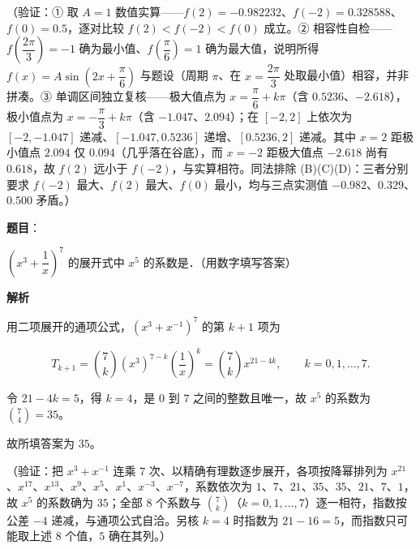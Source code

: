 \begin{answer}
（验证：① 取 \(A=1\) 数值实算——\(f(2)=-0.982232\)、\(f(-2)=0.328588\)、\(f(0)=0.5\)，逐对比较 \(f(2)<f(-2)<f(0)\) 成立。② 相容性自检——\(f\left(\dfrac{2\pi}{3}\right)=-1\) 确为最小值、\(f\left(\dfrac{\pi}{6}\right)=1\) 确为最大值，说明所得 \(f(x)=A\sin\left(2x+\dfrac{\pi}{6}\right)\) 与题设（周期 \(\pi\)、在 \(x=\dfrac{2\pi}{3}\) 处取最小值）相容，并非拼凑。③ 单调区间独立复核——极大值点为 \(x=\dfrac{\pi}{6}+k\pi\)（含 \(0.5236\)、\(-2.618\)），极小值点为 \(x=-\dfrac{\pi}{3}+k\pi\)（含 \(-1.047\)、\(2.094\)）；在 \([-2,2]\) 上依次为 \([-2,-1.047]\) 递减、\([-1.047,0.5236]\) 递增、\([0.5236,2]\) 递减。其中 \(x=2\) 距极小值点 \(2.094\) 仅 \(0.094\)（几乎落在谷底），而 \(x=-2\) 距极大值点 \(-2.618\) 尚有 \(0.618\)，故 \(f(2)\) 远小于 \(f(-2)\)，与实算相符。同法排除 (B)(C)(D)：三者分别要求 \(f(-2)\) 最大、\(f(2)\) 最大、\(f(0)\) 最小，均与三点实测值 \(-0.982\)、\(0.329\)、\(0.500\) 矛盾。）


\end{answer}
\begin{answer}

\textbf{题目}：

\(\left(x^3+\dfrac{1}{x}\right)^7\) 的展开式中 \(x^5\) 的系数是\gkblank{}．（用数字填写答案）

\textbf{解析}

用二项展开的通项公式，\((x^{3}+x^{-1})^{7}\) 的第 \(k+1\) 项为

\nopagebreak[4]
\[ T_{k+1}=\binom{7}{k}\left(x^{3}\right)^{7-k}\left(\dfrac{1}{x}\right)^{k}=\binom{7}{k}x^{21-4k},\qquad k=0,1,\dots,7 . \]

令 \(21-4k=5\)，得 \(k=4\)，是 \(0\) 到 \(7\) 之间的整数且唯一，故 \(x^{5}\) 的系数为 \(\binom{7}{4}=35\)。

故所填答案为 \(35\)。

（验证：把 \(x^{3}+x^{-1}\) 连乘 \(7\) 次、以精确有理数逐步展开，各项按降幂排列为 \(x^{21}\)、\(x^{17}\)、\(x^{13}\)、\(x^{9}\)、\(x^{5}\)、\(x^{1}\)、\(x^{-3}\)、\(x^{-7}\)，系数依次为 \(1\)、\(7\)、\(21\)、\(35\)、\(35\)、\(21\)、\(7\)、\(1\)，故 \(x^{5}\) 的系数确为 \(35\)；全部 \(8\) 个系数与 \(\binom{7}{k}\)（\(k=0,1,\dots,7\)）逐一相符，指数按公差 \(-4\) 递减，与通项公式自洽。另核 \(k=4\) 时指数为 \(21-16=5\)，而指数只可能取上述 \(8\) 个值，\(5\) 确在其列。）


\end{answer}
